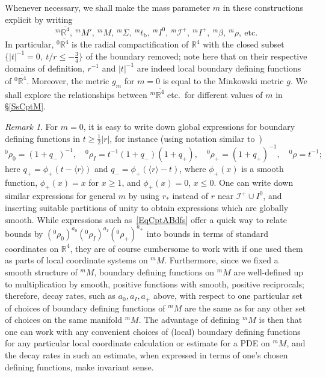 \documentclass[reqno,11pt,letterpaper]{amsart}
\numberwithin{equation}{section}
\numberwithin{figure}{section}
\theoremstyle{definition}
\theoremstyle{remark}
\newtheorem{rmk}[thm]{Remark}
\newcommand{\ms}{\mathscr}
\newcommand{\scri}{\ms I}
\newcommand{\R}{\mathbb{R}}
\newcommand{\la}{\langle}
\newcommand{\ol}{\overline}
\newcommand{\ra}{\rangle}
\newcommand{\ul}[1]{\underline{#1}{}}
\newcommand{\bop}{{\mathrm{b}}}
\newcommand{\half}{\tfrac{1}{2}}
\begin{document}
Whenever necessary, we shall make the mass parameter $m$ in these constructions explicit by writing
\begin{equation}
\label{EqCptAExpl}
  {}^m\ol{\R^4},\ {}^m\!M',\ {}^m\!M,\ {}^m\Sigma,\ {}^m t_\bop,\ {}^m I^0,\ {}^m\!\scri^+,\ {}^m I^+,\ {}^m\beta,\ {}^m\!\rho,\ \text{etc.}
\end{equation}
In particular, ${}^0\ol{\R^4}$ is the radial compactification of $\R^4$ with the closed subset $\{|t|^{-1}=0,\ t/r\leq-\tfrac34\}$ of the boundary removed; note here that on their respective domains of definition, $r^{-1}$ and $|t|^{-1}$ are indeed local boundary defining functions of ${}^0\ol{\R^4}$. Moreover, the metric $g_m$ for $m=0$ is equal to the Minkowski metric $\ul g$. We shall explore the relationships between ${}^m\ol{\R^4}$ etc.\ for different values of $m$ in \S\ref{SsCptM}.

\begin{rmk}
\label{RmkCptABdfs}
  For $m=0$, it is easy to write down global expressions for boundary defining functions in $t\geq\half|r|$, for instance (using notation similar to~\cite{LindbladAsymptotics})
  \begin{equation}
  \label{EqCptABdfs}
    {}^0\rho_0 = (1+q_-)^{-1}, \quad
    {}^0\rho_I = t^{-1}(1+q_-)(1+q_+),\quad
    {}^0\rho_+ = (1+q_+)^{-1}, \quad
    {}^0\rho = t^{-1};
  \end{equation}
  here $q_+=\phi_+(t-\la r\ra)$ and $q_-=\phi_+(\la r\ra-t)$, where $\phi_+(x)$ is a smooth function, $\phi_+(x)=x$ for $x\geq 1$, and $\phi_+(x)=0$, $x\leq 0$. One can write down similar expressions for general $m$ by using $r_*$ instead of $r$ near $\scri^+\cup I^0$, and inserting suitable partitions of unity to obtain expressions which are globally smooth. While expressions such as~\eqref{EqCptABdfs} offer a quick way to relate bounds by $({}^0\rho_0)^{a_0}({}^0\rho_I)^{a_I}({}^0\rho_+)^{a_+}$ into bounds in terms of standard coordinates on $\R^4$, they are of course cumbersome to work with if one used them as parts of local coordinate systems on ${}^m\!M$. Furthermore, since we fixed a smooth structure of ${}^m\!M$, boundary defining functions on ${}^m\!M$ are well-defined up to multiplication by smooth, positive functions with smooth, positive reciprocals; therefore, decay rates, such as $a_0,a_I,a_+$ above, with respect to one particular set of choices of boundary defining functions of ${}^m\!M$ are the same as for any other set of choices on the same manifold ${}^m\!M$. The advantage of defining ${}^m\!M$ is then that one can work with any convenient choices of (local) boundary defining functions for any particular local coordinate calculation or estimate for a PDE on ${}^m\!M$, and the decay rates in such an estimate, when expressed in terms of one's chosen defining functions, make invariant sense.
\end{rmk}
 
\end{document}
